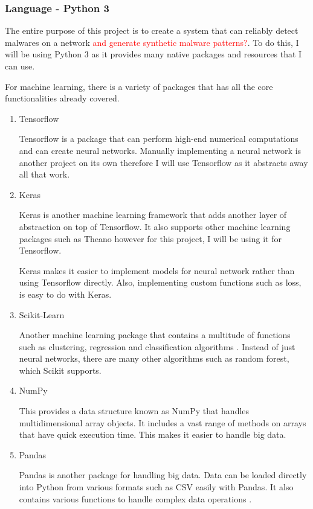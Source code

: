 \documentclass[11pt]{article}
\begin{document}
\subsubsection{Language - Python 3}
The entire purpose of this project is to create a system that can reliably detect malwares on a network \textcolor{red}{and generate synthetic malware patterns?}. To do this, I will be using Python 3 as it provides many native packages and resources that I can use.

For machine learning, there is a variety of packages that has all the core functionalities already covered.

\begin{enumerate}
  \item{Tensorflow}

  Tensorflow is a package that can perform high-end numerical computations \cite{bg-work-tensorflow} and can create neural networks. Manually implementing a neural network is another project on its own therefore I will use Tensorflow as it abstracts away all that work.

  \item{Keras}

  Keras is another machine learning framework that adds another layer of abstraction on top of Tensorflow. It also supports other machine learning packages such as Theano however for this project, I will be using it for Tensorflow. 

  Keras makes it easier to implement models for neural network rather than using Tensorflow directly. Also, implementing custom functions such as loss, is easy to do with Keras.
  \item{Scikit-Learn}

  Another machine learning package that contains a multitude of functions such as clustering, regression and classification algorithms \cite{bg-work-tensorflow}. Instead of just neural networks, there are many other algorithms such as random forest, which Scikit supports.

  \item{NumPy}

  This provides a data structure known as NumPy that handles multidimensional array objects. It includes a vast range of methods on arrays that have quick execution time. This makes it easier to handle big data.

  \item{Pandas}

  Pandas is another package for handling big data. Data can be loaded directly into Python from various formats such as CSV easily with Pandas. It also contains various functions to handle complex data operations \cite{bg-work-tensorflow}.


\end{enumerate}
\end{document}
